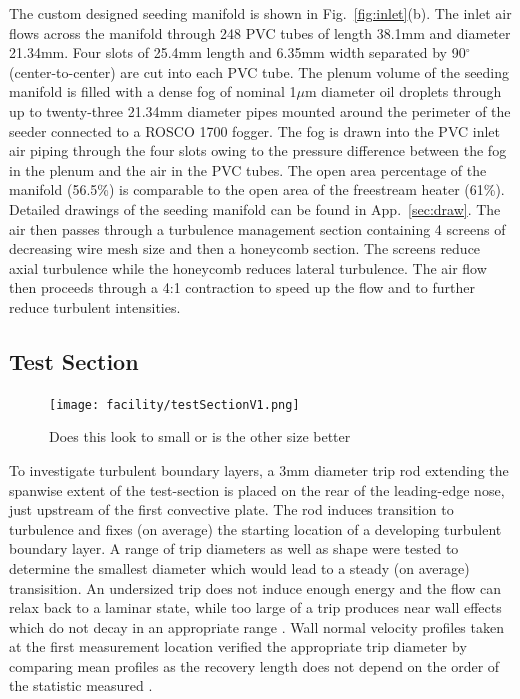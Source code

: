 The custom designed seeding manifold is shown in Fig.~\ref{fig:inlet}(b). 
The inlet air flows across the manifold through 248 PVC tubes of length 38.1mm and diameter 21.34mm. 
Four slots of 25.4mm length and 6.35mm width separated by 90$^\circ$ (center-to-center) are cut into each PVC tube. 
The plenum volume of the seeding manifold is filled with a dense fog of nominal 1$\mu$m  diameter oil droplets \cite{Shakerin1995} through up to twenty-three 21.34mm diameter pipes mounted around the perimeter of the seeder connected to a ROSCO 1700 fogger. 
The fog is drawn into the PVC inlet air piping through the four slots owing to the pressure difference between the fog in the plenum and the air in the PVC tubes. 
The open area percentage of the manifold (56.5\%) is comparable to the open area of the freestream heater (61\%). 
Detailed drawings of the seeding manifold can be found in App.~\ref{sec:draw}.
The air then passes through a turbulence management section containing 4 screens of decreasing wire mesh size and then a honeycomb section.
The screens reduce axial turbulence while the honeycomb reduces lateral turbulence.
The air flow then proceeds through a 4:1 contraction to speed up the flow and to further reduce turbulent intensities.

\subsection{Test Section}

\begin{figure}[h!]
\centering
\texttt{[image: facility/testSectionV1.png]}
\caption{\footnotesize Does this look to small or is the other size better}
\label{fig:testSection}
\end{figure}

To investigate turbulent boundary layers, a 3mm diameter trip rod extending the spanwise extent of the test-section is placed on the rear of the leading-edge nose, just upstream of the first convective plate.
The rod induces transition to turbulence and fixes (on average) the starting location of a developing turbulent boundary layer.
A range of trip diameters as well as shape were tested to determine the smallest diameter which would lead to a steady (on average) transisition. 
An undersized trip does not induce enough energy and the flow can relax back to a laminar state, while too large of a trip produces near wall effects which do not decay in an appropriate range \cite{Marusic2015}.
Wall normal velocity profiles taken at the first measurement location verified the appropriate trip diameter by comparing mean profiles as the recovery length does not depend on the order of the statistic measured \cite{Marusic2015}.

